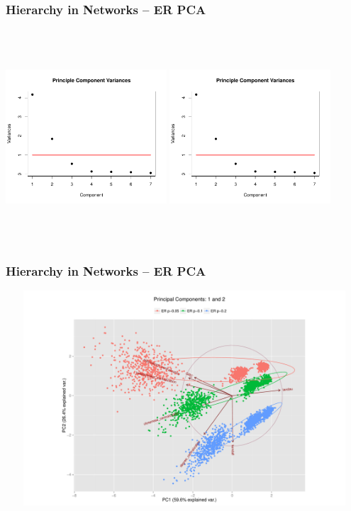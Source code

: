 \documentclass[xcolor={table}]{beamer}
\newenvironment{changemargin}[2]{%
  \begin{list}{}{%
    \setlength{\topsep}{0pt}%
    \setlength{\leftmargin}{#1}%
    \setlength{\rightmargin}{#2}%
    \setlength{\listparindent}{\parindent}%
    \setlength{\itemindent}{\parindent}%
    \setlength{\parsep}{\parskip}%
  }%
  \item[]}{\end{list}}
\begin{document}
\begin{frame}\frametitle{Hierarchy in Networks -- ER PCA}
	\begin{changemargin}{-2cm}{ -2cm}
		\centering
		\includegraphics[width=6cm, height=8cm]{images/ER_Param_PCA_Component_Varinces.pdf}
		\includegraphics[width=6cm, height=8cm]{images/ER_Size_PCA_Component_Varinces.pdf}
	\end{changemargin}
\end{frame}

\begin{frame}\frametitle{Hierarchy in Networks -- ER PCA}
	\begin{changemargin}{-2cm}{ -2cm}
		\centering
		\includegraphics[width=15cm, height=8cm]{images/ER_Param_PCA_Components1_2.pdf}
	\end{changemargin}
\end{frame}
\end{document}
